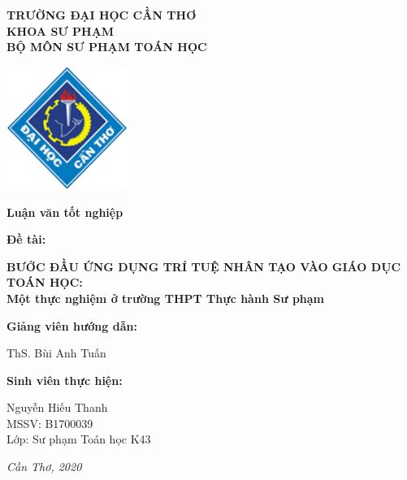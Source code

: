 \thispagestyle{empty}
\begin{center}\large
	\textbf{TRƯỜNG ĐẠI HỌC CẦN THƠ}\\
	\textbf{KHOA SƯ PHẠM}\\
	\textbf{BỘ MÔN SƯ PHẠM TOÁN HỌC}
\end{center}
\vfill
{\centering\includegraphics[width=4cm]{images/ctu-logo.png}\par}
\vfill
{\centering\LARGE\textbf{Luận văn tốt nghiệp}\par}
\vfill
\begin{center}\huge
	\textbf{Đề tài:}\par
	\textbf{BƯỚC ĐẦU ỨNG DỤNG TRÍ TUỆ NHÂN TẠO VÀO GIÁO DỤC TOÁN HỌC:}\\
	\textbf{Một thực nghiệm ở trường THPT Thực hành Sư phạm}
\end{center}
\vfill
\begin{adjustwidth}{1cm}{-1cm}
\begin{multicols}{2}\large
	\textbf{Giảng viên hướng dẫn:}\par
	ThS. Bùi Anh Tuấn\par
	\columnbreak
	\textbf{Sinh viên thực hiện:}\par
	Nguyễn Hiếu Thanh\\
	MSSV: B1700039\\
	Lớp: Sư phạm Toán học K43
\end{multicols}
\end{adjustwidth}
\vfill
{\centering\large\textit{Cần Thơ, 2020}\par}
\newpage